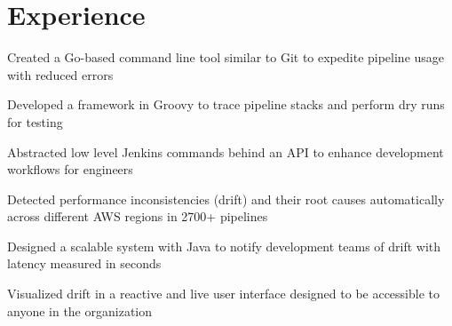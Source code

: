 \documentclass[]{deedy-resume}
\begin{document}
\begin{minipage}[t]{0.66\textwidth} 


\section{Experience}
\vspace{\topsep} %
\begin{tightemize}
\item Created a Go-based command line tool similar to Git to expedite pipeline usage with reduced errors
\item Developed a framework in Groovy to trace pipeline stacks and perform dry runs for testing
\item Abstracted low level Jenkins commands behind an API to enhance development workflows for engineers
\end{tightemize}
\sectionsep %

\begin{tightemize}
\item Detected performance inconsistencies (drift) and their root causes automatically across different AWS regions in 2700+ pipelines
\item Designed a scalable system with Java to notify development teams of drift with latency measured in seconds
\item Visualized drift in a reactive and live user interface designed to be accessible to anyone in the organization
\end{tightemize}
\sectionsep %


\end{minipage}
\end{document}
